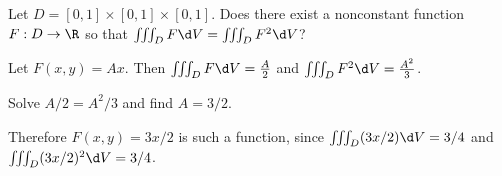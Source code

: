 \documentclass{ximera}
\author{Jim Fowler}
\begin{document}
\begin{exercise}
  Let $D = [0,1] \times [0,1] \times [0,1]$.  Does there exist a
  nonconstant function $F : D \to \R$ so that
  $\iiint_D F \d V = \iiint_D F^2 \d V$?

  \begin{multipleChoice}
  \end{multipleChoice}
  
  \begin{hint}
    Let $F(x,y) = A x$.  Then 
    $\iiint_D F \d V = \frac{A}{2}$ and $\iiint_D F^2 \d V = \frac{A^2}{3}$.
  \end{hint}
  
  \begin{hint}
    Solve $A/2 = A^2 / 3$ and find $A = 3/2$.
  \end{hint}
  
  \begin{hint}
    Therefore $F(x,y) = 3x/2$ is such a function, since $\iiint_D (3x/2) \d V = 3/4$ and $\iiint_D (3x/2)^2 \d V = 3/4$.
  \end{hint}

\end{exercise}
\end{document}
